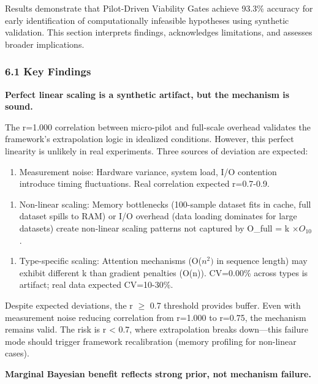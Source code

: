 
Results demonstrate that Pilot-Driven Viability Gates achieve 93.3\% accuracy for early identification of computationally infeasible hypotheses using synthetic validation. This section interprets findings, acknowledges limitations, and assesses broader implications.

\subsubsection{6.1 Key Findings}

\textbf{Perfect linear scaling is a synthetic artifact, but the mechanism is sound.}

The r=1.000 correlation between micro-pilot and full-scale overhead validates the framework's extrapolation logic in idealized conditions. However, this perfect linearity is unlikely in real experiments. Three sources of deviation are expected:

\begin{enumerate}
\item Measurement noise: Hardware variance, system load, I/O contention introduce timing fluctuations. Real correlation expected r=0.7-0.9.
\end{enumerate}

\begin{enumerate}
\item Non-linear scaling: Memory bottlenecks (100-sample dataset fits in cache, full dataset spills to RAM) or I/O overhead (data loading dominates for large datasets) create non-linear scaling patterns not captured by O\_full = k $\times O_{10}$.
\end{enumerate}

\begin{enumerate}
\item Type-specific scaling: Attention mechanisms (O($n^{2})$ in sequence length) may exhibit different k than gradient penalties (O(n)). CV=0.00\% across types is artifact; real data expected CV=10-30\%.
\end{enumerate}

Despite expected deviations, the r $\geq$ 0.7 threshold provides buffer. Even with measurement noise reducing correlation from r=1.000 to r=0.75, the mechanism remains valid. The risk is r < 0.7, where extrapolation breaks down---this failure mode should trigger framework recalibration (memory profiling for non-linear cases).

\textbf{Marginal Bayesian benefit reflects strong prior, not mechanism failure.}

